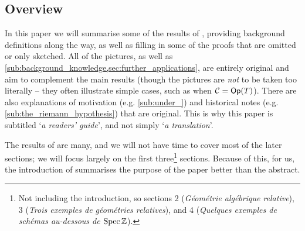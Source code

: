 
\subsection{Overview} %
\label{sub:overview}

    In this paper we will summarise some of the results of \cite{Toen:2005wxa}, providing background definitions along the way, as well as filling in some of the proofs that are omitted or only sketched.
    All of the pictures, as well as \cref{sub:background_knowledge,sec:further_applications}, are entirely original and aim to complement the main results (though the pictures are \emph{not} to be taken too literally -- they often illustrate simple cases, such as when $\mathcal{C}=\mathsf{Op}(T)$).
    There are also explanations of motivation (e.g. \cref{sub:under_}) and historical notes (e.g. \cref{sub:the_riemann_hypothesis}) that are original.
    This is why this paper is subtitled `\emph{a readers' guide}', and not simply `\emph{a translation}'.

    The results of \cite{Toen:2005wxa} are many, and we will not have time to cover most of the later sections;  we will focus largely on the first three\footnote{
        Not including the introduction, so sections 2 (\emph{Géométrie algébrique relative}), 3 (\emph{Trois exemples de géométries relatives}), and 4 (\emph{Quelques exemples de schémas au-dessous de $\operatorname{Spec}\mathbb{Z}$}).
    } sections.
    Because of this, for us, the introduction of \cite{Toen:2005wxa} summarises the purpose of the paper better than the abstract.

    \vspace{-1em}

